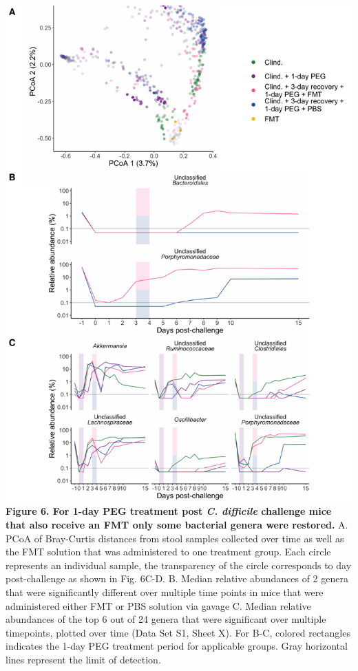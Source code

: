 \documentclass[
  11pt,
]{article}
\begin{document}
\includegraphics{figure_6.pdf} \textbf{Figure 6. For 1-day PEG treatment
post \emph{C. difficile} challenge mice that also receive an FMT only
some bacterial genera were restored.} A. PCoA of Bray-Curtis distances
from stool samples collected over time as well as the FMT solution that
was administered to one treatment group. Each circle represents an
individual sample, the transparency of the circle corresponds to day
post-challenge as shown in Fig. 6C-D. B. Median relative abundances of 2
genera that were significantly different over multiple time points in
mice that were administered either FMT or PBS solution via gavage C.
Median relative abundances of the top 6 out of 24 genera that were
significant over multiple timepoints, plotted over time (Data Set S1,
Sheet X). For B-C, colored rectangles indicates the 1-day PEG treatment
period for applicable groups. Gray horizontal lines represent the limit
of detection.
\end{document}
